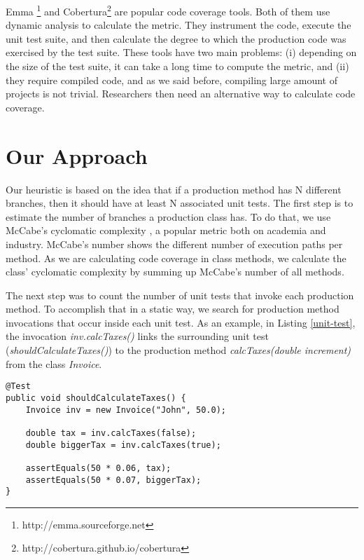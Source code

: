 \documentclass{sig-alternate}
\begin{document}
Emma \footnote{http://emma.sourceforge.net} and Cobertura\footnote{http://cobertura.github.io/cobertura} are popular 
code coverage tools. Both of them use dynamic analysis to calculate the metric. They instrument the code, execute 
the unit test suite, and then calculate the degree to which the production code was exercised by the test suite. 
These tools have two main problems: (i) depending on the size of the test suite, it can take a long time to compute
the metric, and (ii) they require compiled code, and as we said before, compiling large amount of projects is not trivial. Researchers then need an alternative way to calculate code coverage.


\section{Our Approach}
\label{sec-heuristic}

Our heuristic is based on the idea that if a production method has N different branches, then it should
have at least N associated unit tests. The first step is to estimate the number of branches 
a production class has. To do that, we use McCabe's cyclomatic complexity \cite{mccabe}, a popular
metric both on academia and industry.
McCabe's number shows the different number of execution paths per method. 
As we are calculating code coverage in class methods, we calculate the class' cyclomatic complexity
by summing up McCabe's number of all methods.

The next step was to count the number of unit tests that invoke each production method. To accomplish that
in a static way, we search for production method invocations that occur inside each unit test. As an example, in Listing
\ref{unit-test}, the invocation \textit{inv.calcTaxes()} links the surrounding unit test (\textit{shouldCalculateTaxes()}) to 
the production method \textit{calcTaxes(double increment)} from the class \textit{Invoice}.

\begin{lstlisting}
@Test
public void shouldCalculateTaxes() {
	Invoice inv = new Invoice("John", 50.0);

	double tax = inv.calcTaxes(false);
	double biggerTax = inv.calcTaxes(true);
		
	assertEquals(50 * 0.06, tax);
	assertEquals(50 * 0.07, biggerTax);
}
\end{lstlisting}
\end{document}
